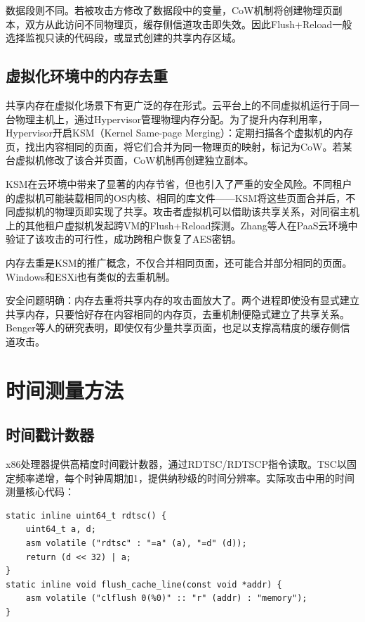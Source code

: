 数据段则不同。若被攻击方修改了数据段中的变量，CoW机制将创建物理页副本，双方从此访问不同物理页，缓存侧信道攻击即失效。因此Flush+Reload一般选择监视只读的代码段，或显式创建的共享内存区域。

\subsection{虚拟化环境中的内存去重}

共享内存在虚拟化场景下有更广泛的存在形式。云平台上的不同虚拟机运行于同一台物理主机上，通过Hypervisor管理物理内存分配。为了提升内存利用率，Hypervisor开启KSM（Kernel Same-page Merging）：定期扫描各个虚拟机的内存页，找出内容相同的页面，将它们合并为同一物理页的映射，标记为CoW。若某台虚拟机修改了该合并页面，CoW机制再创建独立副本。

KSM在云环境中带来了显著的内存节省，但也引入了严重的安全风险。不同租户的虚拟机可能装载相同的OS内核、相同的库文件——KSM将这些页面合并后，不同虚拟机的物理页即实现了共享。攻击者虚拟机可以借助该共享关系，对同宿主机上的其他租户虚拟机发起跨VM的Flush+Reload探测。Zhang等人在PaaS云环境中验证了该攻击的可行性，成功跨租户恢复了AES密钥。

内存去重是KSM的推广概念，不仅合并相同页面，还可能合并部分相同的页面。Windows和ESXi也有类似的去重机制。

安全问题明确：内存去重将共享内存的攻击面放大了。两个进程即使没有显式建立共享内存，只要恰好存在内容相同的内存页，去重机制便隐式建立了共享关系。Benger等人的研究表明，即使仅有少量共享页面，也足以支撑高精度的缓存侧信道攻击。

\section{时间测量方法}

\subsection{时间戳计数器}

x86处理器提供高精度时间戳计数器，通过RDTSC/RDTSCP指令读取。TSC以固定频率递增，每个时钟周期加1，提供纳秒级的时间分辨率。实际攻击中用的时间测量核心代码：

\begin{verbatim}
static inline uint64_t rdtsc() {
    uint64_t a, d;
    asm volatile ("rdtsc" : "=a" (a), "=d" (d));
    return (d << 32) | a;
}
static inline void flush_cache_line(const void *addr) {
    asm volatile ("clflush 0(%0)" :: "r" (addr) : "memory");
}
\end{verbatim}

